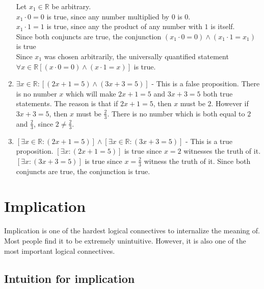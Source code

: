 \begin{solutions}
\begin{enumerate}
		\begin{fitch*}
			\textrm{Let $x_1  \in \mathbb{R}$ be arbitrary.}\\
			\textrm{$x_1 \cdot 0 = 0$ is true, since any number multiplied by $0$ is $0$. }\\
			\textrm{$x_1 \cdot 1 = 1$ is true, since any the product of any number with $1$ is  itself.}\\
			\textrm{Since both conjuncts are true, the conjunction $(x_1 \cdot 0 = 0) \wedge (x_1 \cdot 1 = x_1)$ is true}\\
			\textrm{Since $x_1$ was chosen arbitrarily, the universally quantified statement}\\
			 \textrm{ \hphantom{dsada} $\forall x \in \mathbb{R} [(x \cdot 0 = 0) \wedge (x \cdot 1 = x) ]$ is true.} 
			\end{fitch*}
		\item $\exists x \in \mathbb{R}: [(2x+1 = 5) \wedge (3x+3 = 5)]$ - This is a false proposition.  There is no number $x$ which will make $2x+1 = 5$ and $3x+3 = 5$ both true statements.  The reason is that if $2x+1  = 5$, then $x$ must be $2$.   However if $3x+3 = 5$, then $x$ must be $\frac{2}{3}$.  There is no number which is both equal to $2$ and $\frac{2}{3}$, since $2 \neq \frac{2}{3}$.
		\item $[\exists x \in \mathbb{R}: (2x+1 = 5)] \wedge [\exists x \in \mathbb{R}: (3x+3 = 5)]$ - This is a true proposition. $[\exists x: (2x+1 = 5)] $ is true since $x=2$ witnesses the truth of it.   $[\exists x: (3x+3 = 5)]$ is true since $x= \frac{2}{3}$ witness the truth of it. Since both conjuncts are true, the conjunction is true.
	\end{enumerate}



\end{solutions}


\section{Implication}

Implication is one of the hardest logical connectives to internalize the meaning of.  Most people find it to be extremely unintuitive. However, it is also one of the most important logical connectives.

\subsection{Intuition for implication}

